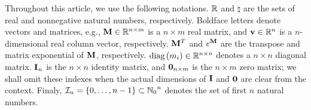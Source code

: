 Throughout this article, we use the following notations. $\mathbb{R}$ and $\natural$ are the sets of real and nonnegative natural numbers, respectively. Boldface letters denote vectors and matrices, e.g., $\m{M} \in \real^{n \times m}$ is a $n \times m$ real matrix, and $\v{v} \in \real^n$ is a $n$-dimensional real column vector, respectively. $\m{M}^T$ and $e^\m{M}$ are the transpose and matrix exponential of $\m{M}$, respectively. $\text{diag}\left(m_i\right) \in \mathbb{R}^{n \times n}$ denotes a $n \times n$ diagonal matrix. $\mI_n$ is the $n \times n$ identity matrix, and $\mZ_{n \times m}$ is the $n \times m$ zero matrix; we shall omit these indexes when the actual dimensions of $\mI$ and $\mZ$ are clear from the context. Finaly, $\mathcal{I}_n = \{ 0, \dots, n - 1 \} \subset {\mathbb{N}_0}^n$ denotes the set of first $n$ natural numbers.
